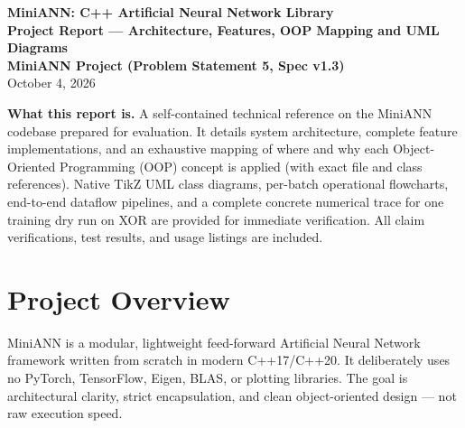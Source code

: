\documentclass[11pt,a4paper]{article}
\begin{document}
\begin{center}
    {\LARGE \textbf{MiniANN: C++ Artificial Neural Network Library}}\\[6pt]
    {\large \textbf{Project Report --- Architecture, Features, OOP Mapping and UML Diagrams}}\\[10pt]
    {\normalsize \textbf{MiniANN Project (Problem Statement 5, Spec v1.3)}}\\[6pt]
    {\normalsize October 4, 2026}
\end{center}

\vspace{1em}
\noindent
\textbf{What this report is.} A self-contained technical reference on the MiniANN codebase prepared for evaluation. It details system architecture, complete feature implementations, and an exhaustive mapping of where and why each Object-Oriented Programming (OOP) concept is applied (with exact file and class references). Native TikZ UML class diagrams, per-batch operational flowcharts, end-to-end dataflow pipelines, and a complete concrete numerical trace for one training dry run on XOR are provided for immediate verification. All claim verifications, test results, and usage listings are included.

\vspace{1em}
\tableofcontents
\newpage

\section{Project Overview}

MiniANN is a modular, lightweight feed-forward Artificial Neural Network framework written from scratch in modern C++17/C++20. It deliberately uses no PyTorch, TensorFlow, Eigen, BLAS, or plotting libraries. The goal is architectural clarity, strict encapsulation, and clean object-oriented design --- not raw execution speed.
\end{document}
